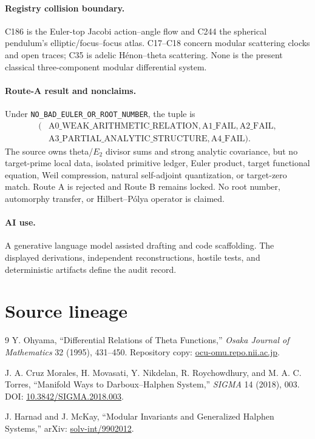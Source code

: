 \documentclass[10pt]{article}
\begin{document}
\paragraph{Registry collision boundary.}
C186 is the Euler-top Jacobi action--angle flow and C244 the spherical
pendulum's elliptic/focus--focus atlas.  C17--C18 concern modular scattering
clocks and open traces; C35 is adelic H\'enon--theta scattering.  None is
the present classical three-component modular differential system.

\paragraph{Route-A result and nonclaims.}
Under \texttt{NO\_BAD\_EULER\_OR\_ROOT\_NUMBER}, the tuple is
\[
 \begin{aligned}
 (&\mathrm{A0\_WEAK\_ARITHMETIC\_RELATION},\mathrm{A1\_FAIL},
 \mathrm{A2\_FAIL},\\
 &\mathrm{A3\_PARTIAL\_ANALYTIC\_STRUCTURE},
 \mathrm{A4\_FAIL}).
 \end{aligned}
\]
The source owns theta/$E_2$ divisor sums and strong analytic covariance, but
no target-prime local data, isolated primitive ledger, Euler product, target
functional equation, Weil compression, natural self-adjoint quantization, or
target-zero match.  Route A is rejected and Route B remains locked.  No root
number, automorphy transfer, or Hilbert--P\'olya operator is claimed.

\paragraph{AI use.}
A generative language model assisted drafting and code scaffolding.  The
displayed derivations, independent reconstructions, hostile tests, and
deterministic artifacts define the audit record.
\fi

\section*{Source lineage}
\begin{thebibliography}{9}
Y. Ohyama, ``Differential Relations of Theta Functions,''
\emph{Osaka Journal of Mathematics} 32 (1995), 431--450. Repository copy:
\href{https://ocu-omu.repo.nii.ac.jp/record/2009467/files/111F0000002-03202-12.pdf}{ocu-omu.repo.nii.ac.jp}.

J. A. Cruz Morales, H. Movasati, Y. Nikdelan, R. Roychowdhury, and
M. A. C. Torres, ``Manifold Ways to Darboux--Halphen System,''
\emph{SIGMA} 14 (2018), 003. DOI:
\href{https://doi.org/10.3842/SIGMA.2018.003}{10.3842/SIGMA.2018.003}.

J. Harnad and J. McKay, ``Modular Invariants and Generalized Halphen
Systems,'' arXiv:
\href{https://arxiv.org/abs/solv-int/9902012}{solv-int/9902012}.
\end{thebibliography}
\end{document}
